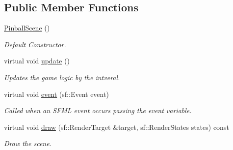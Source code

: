 \subsection*{Public Member Functions}
\begin{DoxyCompactItemize}
\item 
\hypertarget{class_pinball_scene_af6b0e0d7d9765249018dacccc9b4c681}{\hyperlink{class_pinball_scene_af6b0e0d7d9765249018dacccc9b4c681}{Pinball\+Scene} ()}\label{class_pinball_scene_af6b0e0d7d9765249018dacccc9b4c681}

\begin{DoxyCompactList}\small\item\em Default Constructor. \end{DoxyCompactList}\item 
\hypertarget{class_pinball_scene_a99056b13a1d355643b5e2284decc659b}{virtual void \hyperlink{class_pinball_scene_a99056b13a1d355643b5e2284decc659b}{update} ()}\label{class_pinball_scene_a99056b13a1d355643b5e2284decc659b}

\begin{DoxyCompactList}\small\item\em Updates the game logic by the intveral. \end{DoxyCompactList}\item 
virtual void \hyperlink{class_pinball_scene_a57947a5d74f53f73a40df59de2c72078}{event} (sf\+::\+Event event)
\begin{DoxyCompactList}\small\item\em Called when an S\+F\+M\+L event occurs passing the event variable. \end{DoxyCompactList}\item 
virtual void \hyperlink{class_pinball_scene_adb8babf412aa47981951e55bacf66b03}{draw} (sf\+::\+Render\+Target \&target, sf\+::\+Render\+States states) const 
\begin{DoxyCompactList}\small\item\em Draw the scene. \end{DoxyCompactList}\end{DoxyCompactItemize}
